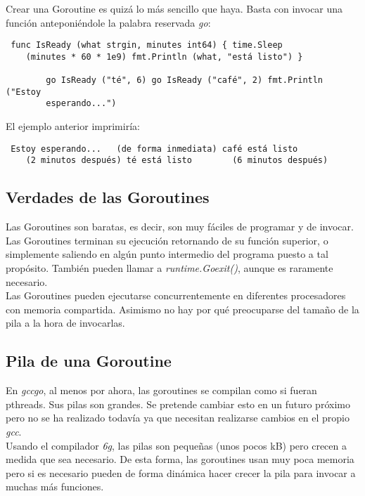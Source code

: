 	Crear una Goroutine es quizá lo más sencillo que haya. Basta con invocar una
	función anteponiéndole la palabra reservada \textit{go}:
	
	\begin{verbatim} func IsReady (what strgin, minutes int64) { time.Sleep
	(minutes * 60 * 1e9) fmt.Println (what, "está listo") }
	   
		go IsReady ("té", 6) go IsReady ("café", 2) fmt.Println ("Estoy
		esperando...") \end{verbatim}
	
	El ejemplo anterior imprimiría:
	
	\begin{verbatim} Estoy esperando...   (de forma inmediata) café está listo
	(2 minutos después) té está listo        (6 minutos después) \end{verbatim}
	
	\subsection{Verdades de las Goroutines}
	
	Las Goroutines son baratas, es decir, son muy fáciles de programar y de
	invocar.\\
	
	Las Goroutines terminan su ejecución retornando de su función superior,
	o simplemente saliendo en algún punto intermedio del programa puesto a tal
	propósito. También pueden llamar a \textit{runtime.Goexit()}, aunque es
	raramente necesario.\\
	
	Las Goroutines pueden ejecutarse concurrentemente en diferentes procesadores
	con memoria compartida. Asimismo no hay por qué preocuparse del tamaño de la
	pila a la hora de invocarlas.
	
	\subsection{Pila de una Goroutine}
	
	En \textit{gccgo}, al menos por ahora, las goroutines se compilan como si
	fueran pthreads. Sus pilas son grandes. Se pretende cambiar esto en un
	futuro próximo pero no se ha realizado todavía ya que necesitan realizarse
	cambios en el propio \textit{gcc}.\\
	
	Usando el compilador \textit{6g}, las pilas son pequeñas (unos pocos kB)
	pero crecen a medida que sea necesario. De esta forma, las goroutines usan
	muy poca memoria pero si es necesario pueden de forma dinámica hacer crecer
	la pila para invocar a muchas más funciones.\\
	
